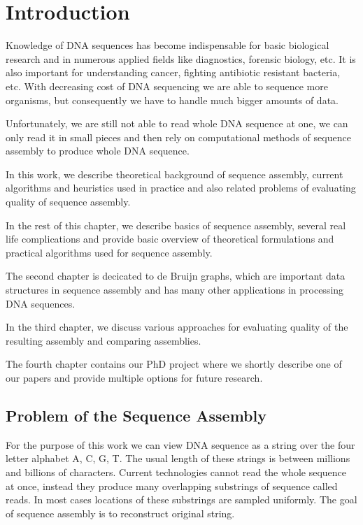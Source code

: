 \chapter{Introduction}

Knowledge of DNA sequences has become indispensable for basic biological research
and in numerous applied fields like diagnostics, forensic biology, etc.
It is also important for understanding cancer, fighting antibiotic resistant bacteria, etc.
With decreasing cost of DNA sequencing we are able to sequence more organisms,
but consequently we have to handle much bigger amounts of data. 

Unfortunately, we are still not able to read whole DNA sequence at one, we can only
read it in small pieces and then rely on computational methods of sequence assembly
to produce whole DNA sequence.

In this work, we describe theoretical background of sequence assembly,
current algorithms and heuristics used in practice and also related 
problems of evaluating quality of sequence assembly.

In the rest of this chapter, we describe basics of sequence assembly,
several real life complications and provide basic overview of theoretical
formulations and practical algorithms used for sequence assembly.

The second chapter is decicated to de Bruijn graphs, which
are important data structures in sequence assembly and has many other
applications in processing DNA sequences.

In the third chapter, we discuss various approaches for evaluating
quality of the resulting assembly and comparing assemblies.

The fourth chapter contains our PhD project where we
shortly describe one of our papers and provide multiple
options for future research.

\section{Problem of the Sequence Assembly}

For the purpose of this work we can view DNA sequence as a string over the
four letter alphabet A, C, G, T. The usual length of these strings
is between millions and billions of characters.
Current technologies cannot read the whole sequence at once, instead they produce many
overlapping substrings of sequence called reads.
In most cases locations of these substrings are sampled uniformly.
The goal of sequence assembly is to reconstruct original string.

